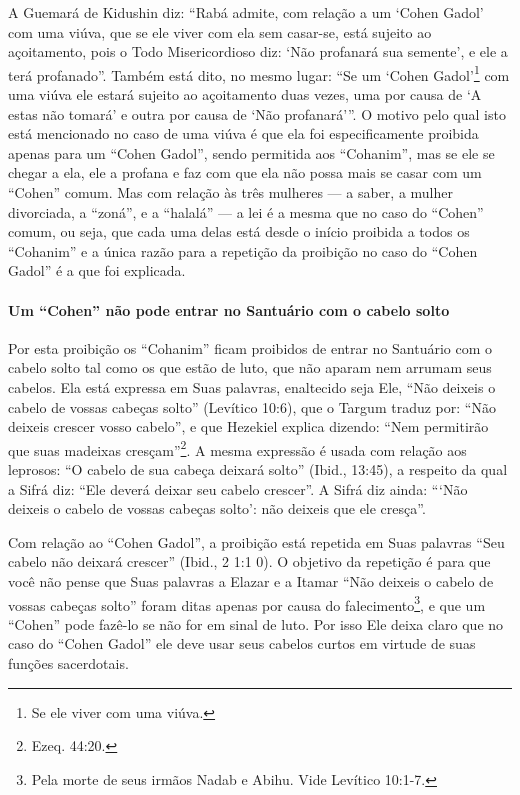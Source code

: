 A Guemará de Kidushin diz: ``Rabá admite, com relação a um `Cohen
Gadol' com uma viúva, que se ele viver com ela sem casar-se, está
sujeito ao açoitamento, pois o Todo Misericordioso diz: `Não profanará
sua semente', e ele a terá profanado''. Também está dito, no mesmo
lugar: ``Se um `Cohen Gadol'\footnote{Se ele viver com uma viúva.} com uma viúva ele
estará sujeito ao açoitamento duas vezes, uma por causa de `A estas não
tomará' e outra por causa de `Não profanará'''. O motivo pelo qual isto
está mencionado no caso de uma viúva é que ela foi especificamente
proibida apenas para um ``Cohen Gadol'', sendo permitida aos
``Cohanim'', mas se ele se chegar a ela, ele a profana e faz com que
ela não possa mais se casar com um ``Cohen'' comum. Mas com relação às
três mulheres --- a saber, a mulher divorciada, a ``zoná'', e a ``halalá'' --- a lei é a mesma que no caso do ``Cohen'' comum, ou seja, que cada uma delas está desde o
início proibida a todos os ``Cohanim'' e a única razão para a repetição
da proibição no caso do ``Cohen Gadol'' é a que foi explicada.

\paragraph{Um ``Cohen'' não pode entrar no Santuário com o cabelo solto}

Por esta proibição os ``Cohanim'' ficam proibidos de entrar no Santuário
com o cabelo solto tal como os que estão de luto, que não aparam nem
arrumam seus cabelos. Ela está expressa em Suas palavras, enaltecido
seja Ele, ``Não deixeis o cabelo de vossas cabeças solto'' (Levítico
10:6), que o Targum traduz por: ``Não deixeis crescer vosso cabelo'', e
que Hezekiel explica dizendo: ``Nem permitirão que suas madeixas
cresçam''\footnote{Ezeq. 44:20.}. A mesma expressão é usada com relação
aos leprosos: ``O cabelo de sua cabeça deixará solto'' (Ibid., 13:45), a
respeito da qual a Sifrá diz: ``Ele deverá deixar seu cabelo crescer''.
A Sifrá diz ainda: ```Não deixeis o cabelo de vossas cabeças solto': não
deixeis que ele cresça''.

Com relação ao ``Cohen Gadol'', a proibição está repetida em Suas
palavras ``Seu cabelo não deixará crescer'' (Ibid., 2 1:1 0). O objetivo
da repetição é para que você não pense que Suas palavras a Elazar e a
Itamar ``Não deixeis o cabelo de vossas cabeças solto'' foram ditas
apenas por causa do falecimento\footnote{Pela morte de seus irmãos Nadab e Abihu. Vide Levítico 10:1-7.}, e que um
``Cohen'' pode fazê-lo se não for em sinal de luto. Por isso Ele deixa
claro que no caso do ``Cohen Gadol'' ele deve usar seus cabelos curtos
em virtude de suas funções sacerdotais.

